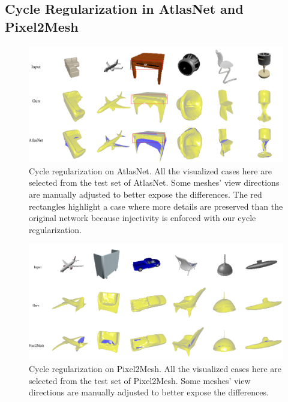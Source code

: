 \subsection{Cycle Regularization in AtlasNet and Pixel2Mesh}
\begin{figure}
	\centering
	\includegraphics[width=\linewidth]{img/atlas/svr}
	\caption{Cycle regularization on AtlasNet. All the visualized cases here are selected from the test set of AtlasNet. Some meshes' view directions are manually adjusted to better expose the differences. The red rectangles highlight a case where more details are preserved than the original network because injectivity is enforced with our cycle regularization.}
	\label{fig:svr}
\end{figure}
\begin{figure}
	\centering
	\includegraphics[width=\linewidth]{img/p2m/final}
	\caption{Cycle regularization on Pixel2Mesh. All the visualized cases here are selected from the test set of Pixel2Mesh. Some meshes' view directions are manually adjusted to better expose the differences.}
	\label{fig:p2m}
\end{figure}
